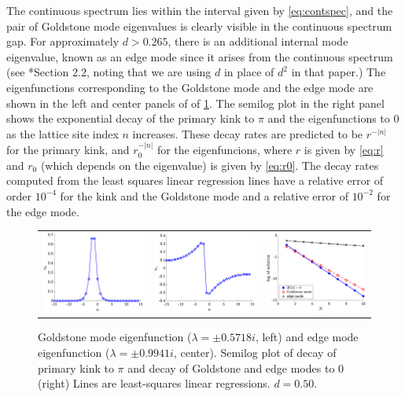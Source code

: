 \documentclass[12pt,reqno]{amsart}
\begin{document}
The continuous spectrum lies within the interval given by \cref{eq:contspec}, and the pair of Goldstone mode eigenvalues is clearly visible in the continuous spectrum gap. For approximately $d > 0.265$, there is an additional internal mode eigenvalue, known as an edge mode since it arises from the continuous spectrum (see \cite{KevrekidisWeinstein2000}*{Section 2.2}, noting that we are using $d$ in place of $d^2$ in that paper.) The eigenfunctions corresponding to the Goldstone mode and the edge mode are shown in the left and center panels of of \cref{fig:kinkeig}. The semilog plot in the right panel shows the exponential decay of the primary kink to $\pi$ and the eigenfunctions to 0 as the lattice site index $n$ increases. These decay rates are predicted to be $r^{-|n|}$ for the primary kink, and $r_0^{-|n|}$ for the eigenfuncions, where $r$ is given by \cref{eq:r} and $r_0$ (which depends on the eigenvalue) is given by \cref{eq:r0}. The decay rates computed from the least squares linear regression lines have a relative error of order $10^{-4}$ for the kink and the Goldstone mode and a relative error of $10^{-2}$ for the edge mode.

\begin{figure}[H]
	\begin{center}
	\begin{tabular}{ccc}
	\includegraphics[width=5cm]{1kinkgoldstonemode.eps} &
	\includegraphics[width=5cm]{1kinkedgemode.eps} &
	\includegraphics[width=5cm]{decayplot.eps}
	\end{tabular}
	\end{center}
	\caption{Goldstone mode eigenfunction ($\lambda = \pm 0.5718 i$, left) and edge mode eigenfunction ($\lambda = \pm 0.9941 i$, center). Semilog plot of decay of primary kink to $\pi$ and decay of Goldstone and edge modes to 0 (right) Lines are least-squares linear regressions. $d = 0.50$. }
	\label{fig:kinkeig}
\end{figure}
\end{document}
